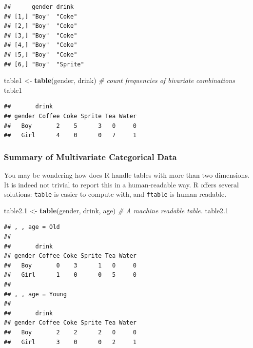 \documentclass[]{book}
\newenvironment{Shaded}{\begin{snugshade}}{\end{snugshade}}
\newcommand{\CommentTok}[1]{\textcolor[rgb]{0.56,0.35,0.01}{\textit{#1}}}
\newcommand{\FloatTok}[1]{\textcolor[rgb]{0.00,0.00,0.81}{#1}}
\newcommand{\KeywordTok}[1]{\textcolor[rgb]{0.13,0.29,0.53}{\textbf{#1}}}
\newcommand{\NormalTok}[1]{#1}
\newcommand{\StringTok}[1]{\textcolor[rgb]{0.31,0.60,0.02}{#1}}
\theoremstyle{definition}
\theoremstyle{definition}
\theoremstyle{definition}
\theoremstyle{remark}
\begin{document}
\begin{verbatim}
##      gender drink   
## [1,] "Boy"  "Coke"  
## [2,] "Boy"  "Coke"  
## [3,] "Boy"  "Coke"  
## [4,] "Boy"  "Coke"  
## [5,] "Boy"  "Coke"  
## [6,] "Boy"  "Sprite"
\end{verbatim}

\begin{Shaded}
\begin{Highlighting}[]
\NormalTok{table1 <-}\StringTok{ }\KeywordTok{table}\NormalTok{(gender, drink) }\CommentTok{# count frequencies of bivariate combinations}
\NormalTok{table1                                      }
\end{Highlighting}
\end{Shaded}

\begin{verbatim}
##       drink
## gender Coffee Coke Sprite Tea Water
##   Boy       2    5      3   0     0
##   Girl      4    0      0   7     1
\end{verbatim}

\hypertarget{summary-of-multivariate-categorical-data}{%
\subsubsection{Summary of Multivariate Categorical Data}\label{summary-of-multivariate-categorical-data}}

You may be wondering how does R handle tables with more than two dimensions.
It is indeed not trivial to report this in a human-readable way.
R offers several solutions: \texttt{table} is easier to compute with, and \texttt{ftable} is human readable.

\begin{Shaded}
\begin{Highlighting}[]
\NormalTok{table2}\FloatTok{.1}\NormalTok{ <-}\StringTok{ }\KeywordTok{table}\NormalTok{(gender, drink, age) }\CommentTok{# A machine readable table. }
\NormalTok{table2}\FloatTok{.1}
\end{Highlighting}
\end{Shaded}

\begin{verbatim}
## , , age = Old
## 
##       drink
## gender Coffee Coke Sprite Tea Water
##   Boy       0    3      1   0     0
##   Girl      1    0      0   5     0
## 
## , , age = Young
## 
##       drink
## gender Coffee Coke Sprite Tea Water
##   Boy       2    2      2   0     0
##   Girl      3    0      0   2     1
\end{verbatim}
\end{document}
